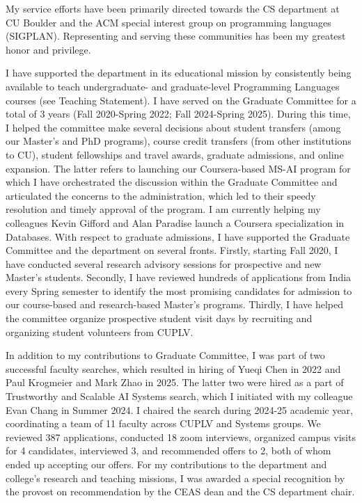 My service efforts have been primarily directed towards the CS department
at CU Boulder and the ACM special interest group on programming languages
(SIGPLAN). Representing and serving these communities has been my greatest
honor and privilege.

\vspace*{0.15in}
 I have supported the department in
its educational mission by consistently being available to teach
undergraduate- and graduate-level Programming Languages courses (see
Teaching Statement). I have served on the Graduate Committee for a total of
3 years (Fall 2020-Spring 2022; Fall 2024-Spring 2025). During this time, I
helped the committee make several decisions about student transfers (among
our Master's and PhD programs), course credit transfers (from other
institutions to CU), student fellowships and travel awards, graduate
admissions, and online expansion. The latter refers to launching our
Coursera-based MS-AI program for which I have orchestrated the discussion
within the Graduate Committee and articulated the concerns to the
administration, which led to their speedy resolution and timely approval of
the program. I am currently helping my colleagues Kevin Gifford and Alan
Paradise launch a Coursera specialization in Databases. With respect to
graduate admissions, I have supported the Graduate Committee and the
department on several fronts. Firstly, starting Fall 2020, I have conducted
several research advisory sessions for prospective and new Master's
students. Secondly, I have reviewed hundreds of applications from India
every Spring semester to identify the most promising candidates for
admission to our course-based and research-based Master's programs.
Thirdly, I have helped the committee organize prospective student visit
days by recruiting and organizing student volunteers from CUPLV.  

In addition to my contributions to Graduate Committee, I was part of two
successful faculty searches, which resulted in hiring of Yueqi Chen in 2022
and Paul Krogmeier and Mark Zhao in 2025. The latter two were hired as a
part of Trustworthy and Scalable AI Systems search, which I initiated with
my colleague Evan Chang in Summer 2024. I chaired the search during 2024-25
academic year, coordinating a team of 11 faculty across CUPLV and Systems
groups. We reviewed 387 applications, conducted 18 zoom interviews,
organized campus visits for 4 candidates, interviewed 3, and recommended
offers to 2, both of whom ended up accepting our offers. For my
contributions to the department and college's research and teaching
missions, I was awarded a special recognition by the provost on
recommendation by the CEAS dean and the CS department chair. 

